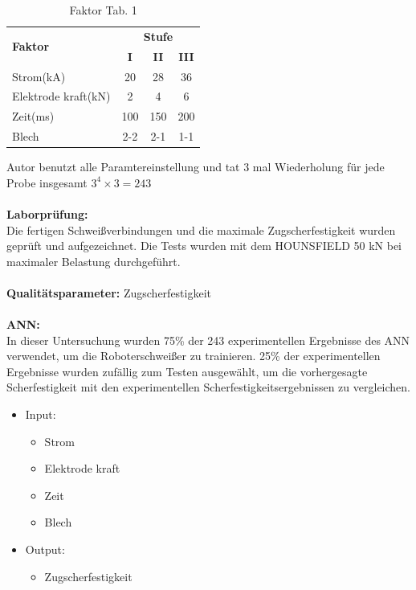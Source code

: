 \documentclass[english,ngerman]{tudscrreprt}
\begin{document}
\begin{table}[H]
\caption{Faktor Tab. 1}
\begin{flushleft}
	\begin{tabular}{lccc} 
		\toprule
 		\multirow{2}{*}{\textbf{Faktor}}&\multicolumn{3}{c}{\textbf{Stufe}} \\
		\cline{2-4} & \textbf{I} & \textbf{II} & \textbf{III}\\
		\midrule
		Strom(kA) & 20 & 28 & 36\\

		Elektrode kraft(kN) & 2 & 4 & 6\\

		Zeit(ms) & 100 & 150 & 200\\

		Blech & 2-2 & 2-1 & 1-1\\
		\bottomrule
	\end{tabular}
\end{flushleft}
\end{table}
Autor benutzt alle Paramtereinstellung und tat 3 mal Wiederholung für jede Probe insgesamt $3^4\times3 =243 $\\
\\
\textbf{Laborprüfung: }\\Die fertigen Schweißverbindungen und die maximale Zugscherfestigkeit wurden geprüft und aufgezeichnet. Die Tests wurden mit dem HOUNSFIELD 50 kN bei maximaler Belastung durchgeführt.\\
\\
\textbf{Qualitätsparameter: }Zugscherfestigkeit\\
\\
\textbf{ANN: }\\
In dieser Untersuchung wurden 75\% der 243 experimentellen Ergebnisse des ANN verwendet, um die Roboterschweißer zu trainieren. 25\% der experimentellen Ergebnisse wurden zufällig zum Testen ausgewählt, um die vorhergesagte Scherfestigkeit mit den experimentellen Scherfestigkeitsergebnissen zu vergleichen.
\begin{itemize}
\item Input:
\begin{itemize}
	\setlength{\itemsep}{0pt}
	\item Strom
	\item Elektrode kraft
	\item Zeit
	\item Blech
\end{itemize}
\item Output:
\begin{itemize}
	\item Zugscherfestigkeit
\end{itemize}
\end{itemize}
\end{document}
